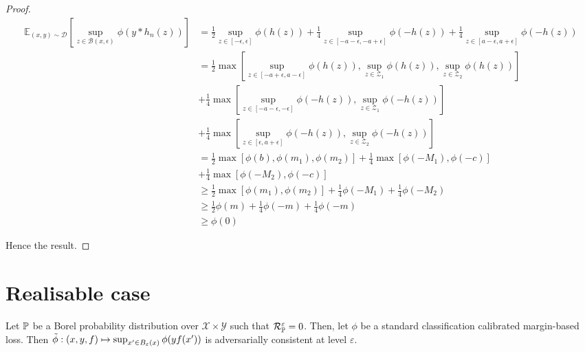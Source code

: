 \begin{proof}
\begin{align*}
    \mathbb{E}_{(x,y)\sim \mathcal{D}}\left[ \sup\limits_{z \in \mathcal{B}(x,\epsilon)} \phi(y*h_n(z))\right] &= \frac{1}{2} \sup\limits_{ z \in \left[ -\epsilon, \epsilon \right]} \phi(h(z))
            + \frac{1}{4}\sup\limits_{z \in \left[ -a-\epsilon, -a+\epsilon \right]} \phi(-h(z)) 
            + \frac{1}{4}\sup\limits_{z \in \left[ a-\epsilon, a+\epsilon \right]} \phi(-h(z)) \\
    &= \frac{1}{2} \max \left[ \sup\limits_{ z \in \left[ -a+\epsilon, a-\epsilon \right]} \phi(h(z)), \sup\limits_{ z \in \mathcal{Z}_1} \phi(h(z)), \sup\limits_{ z \in \mathcal{Z}_2} \phi(h(z)) \right] \\
    &+ \frac{1}{4} \max \left[ \sup\limits_{ z \in \left[ -a-\epsilon, -\epsilon \right]} \phi(-h(z)), \sup\limits_{ z \in \mathcal{Z}_1} \phi(-h(z)) \right] \\
    &+ \frac{1}{4} \max \left[ \sup\limits_{ z \in \left[ \epsilon, a+\epsilon \right]} \phi(-h(z)), \sup\limits_{ z \in \mathcal{Z}_2} \phi(-h(z)) \right] \\
    &= \frac{1}{2} \max \left[ \phi(b), \phi(m_1), \phi(m_2) \right]
    + \frac{1}{4} \max \left[ \phi(-M_1), \phi(-c) \right] \\
    &+ \frac{1}{4} \max \left[ \phi(-M_2), \phi(-c) \right] \\
    &\geq \frac{1}{2} \max \left[\phi(m_1), \phi(m_2) \right] + \frac{1}{4}\phi(-M_1) + \frac{1}{4}\phi(-M_2) \\
    &\geq \frac{1}{2} \phi(m) + \frac{1}{4}\phi(-m) + \frac{1}{4}\phi(-m) \\
    &\geq \phi(0)
\end{align*}

Hence the result.
\end{proof}


\section{Realisable case}

\begin{prop}
Let $\mathbb{P}$ be a Borel probability distribution over $\mathcal{X}\times\mathcal{Y}$ such that $\mathcal{R}^{\varepsilon}_{\mathbb{P}} = 0$. Then, let $\phi$ be a standard classification calibrated margin-based loss. Then $\Tilde{\phi}:(x,y,f)\mapsto\sup_{x'\in B_\varepsilon(x)}\phi(yf(x'))$ is adversarially consistent at level $\varepsilon$.
\end{prop}